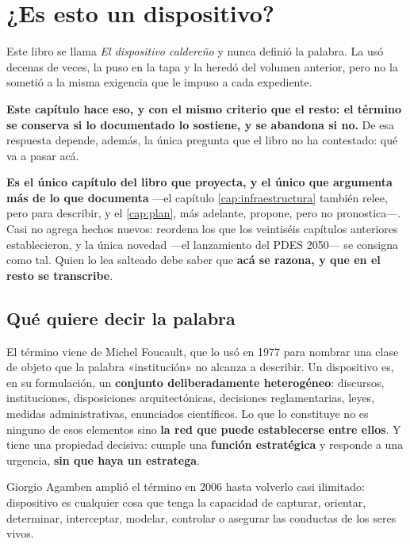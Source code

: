 \chapter{¿Es esto un dispositivo?}
\label{cap:prospectiva}

Este libro se llama \textit{El dispositivo caldereño} y nunca definió la palabra. La usó decenas de veces, la puso en la tapa y la heredó del volumen anterior, pero no la sometió a la
misma exigencia que le impuso a cada expediente.

\textbf{Este capítulo hace eso, y con el mismo criterio que el resto: el término se conserva si
lo documentado lo sostiene, y se abandona si no.} De esa respuesta depende, además, la única
pregunta que el libro no ha contestado: qué va a pasar acá.

\begin{cautela}
\textbf{Es el único capítulo del libro que proyecta, y el único que argumenta más de lo que documenta} ---el capítulo \ref{cap:infraestructura} también relee, pero para describir, y el \ref{cap:plan}, más adelante, propone, pero no pronostica---. Casi no agrega hechos nuevos: reordena los que los veintiséis capítulos anteriores establecieron, y la única novedad ---el lanzamiento del PDES 2050--- se consigna como tal. Quien lo lea salteado debe saber que \textbf{acá se razona, y que en
el resto se transcribe}.
\end{cautela}

\section{Qué quiere decir la palabra}

El término viene de Michel Foucault, que lo usó en 1977 para nombrar una clase de objeto que la
palabra «institución» no alcanza a describir. Un dispositivo es, en su formulación, un
\textbf{conjunto deliberadamente heterogéneo}: discursos, instituciones, disposiciones
arquitectónicas, decisiones reglamentarias, leyes, medidas administrativas, enunciados
científicos. Lo que lo constituye no es ninguno de esos elementos sino \textbf{la red que puede
establecerse entre ellos}. Y tiene una propiedad decisiva: cumple una \textbf{función
estratégica} y responde a una urgencia, \textbf{sin que haya un estratega}.

Giorgio Agamben amplió el término en 2006 hasta volverlo casi ilimitado: dispositivo es
cualquier cosa que tenga la capacidad de capturar, orientar, determinar, interceptar, modelar,
controlar o asegurar las conductas de los seres vivos.

